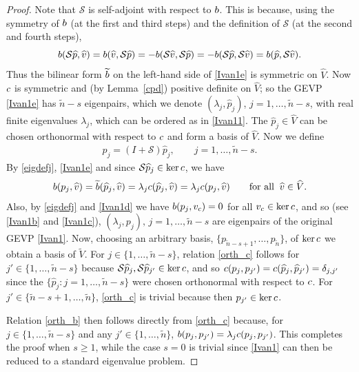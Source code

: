 \documentclass[10pt,a4paper]{amsart}
\newcommand{\scS}{\mathcal{S}}
\newcommand{\txtb}{\textup{\texttt{b}}}
\newcommand{\txtc}{\textup{\texttt{c}}}
\newcommand{\wV}{\widetilde{V}}
\newcommand{\whV}{\widehat{V}}
\newcommand{\whp}{\widehat{p}}
\newcommand{\whv}{\widehat{v}}
\begin{document}
\begin{proof}
Note that $\scS$ is self-adjoint with respect to $\txtb$. This is because, using the symmetry of $\txtb$ (at the first and third steps) 
and the definition of $\scS$ (at the second and fourth steps),  
\[
	\txtb(\scS \whp, \whv) = \txtb(\whv, \scS \whp) = -\txtb(\scS \whv, \scS \whp) 
	= -\txtb( \scS \whp,\scS \whv) =  \txtb(\whp, \scS \whv).
\] 
Thus the bilinear form $\widetilde{\txtb}$ on the left-hand side of \eqref{Ivan1e} is symmetric on $\whV$.
Now $\txtc$ is symmetric and (by Lemma~\ref{cpd}) positive definite on $\whV$;
so the GEVP \eqref{Ivan1e} has $\tilde n-s$ eigenpairs,
which we denote  $(\lambda_j, \whp_{j})$, $j = 1, \ldots , \tilde n-s$, with real finite eigenvalues $\lambda_j$,
which can be ordered as in \eqref{Ivan11}.  The $\whp_{j} \in \whV$ can be chosen orthonormal with respect to $\txtc$ 
and form a basis of $\whV$.  
Now we define 
\begin{align} \label{eigdefj} 
	p_j = (I + \scS)\whp_{j}, \qquad j = 1, \ldots, \tilde n-s.
\end{align} 
By \eqref{eigdefj}, \eqref{Ivan1e} and since $\scS \whp_{j} \in \ker \txtc$, we have 
\[
	\txtb(p_j, \whv) = {\widetilde{\txtb}(\whp_{j},\whv)}
	= \lambda_j \txtc(\whp_{j}, \whv) = \lambda_j \txtc(p_{j}, \whv)
	\qquad \text{for all} \;\; \whv \in \whV.
\]
Also, by \eqref{eigdefj} and \eqref{Ivan1d} we have $\txtb(p_j, v_{\txtc}) = 0$ for all $v_{\txtc} \in \ker \txtc$, and so
(see \eqref{Ivan1b} and  \eqref{Ivan1c}), 
$(\lambda_j, p_j),\,  j = 1, \ldots ,\tilde n-s$
are eigenpairs of the original GEVP \eqref{Ivan1}.
Now, choosing an arbitrary basis, $\{p_{\tilde n-s+1},\ldots,p_{\tilde n}\}$, of {$\ker\txtc$} we obtain a basis of $\wV$. 
For $j \in \{1, \ldots , \tilde n-s\}$, relation \eqref{orth_c} follows for $ j' \in \{ 1, \ldots, \tilde n-s\}$ 
because  $\scS \whp_{j}, \scS \whp_{j'} \in \ker \txtc$, and so $\txtc(p_j,p_{j'}) = \txtc(\whp_{j},\whp_{j'}) = \delta_{j,j'}$ 
since the $\{\whp_{j}: j = 1, \ldots, \tilde n-s\}$ were chosen orthonormal with respect to $\txtc$.   
For $j' \in  \{\tilde n-s+1, \ldots, \tilde n\}$,  \eqref{orth_c} is trivial because then $p_{j'} \in \ker \txtc$.

Relation \eqref{orth_b} then follows directly  from \eqref{orth_c} because,  for $j \in \{1, \ldots, \tilde n-s\}$ 
and any $j' {\in \{1,\dots,\tilde n\}}$, $\txtb(p_j, p_{j'}) = \lambda_j\txtc(p_j, p_{j'})$. 
This completes the proof when $s\ge1$, while the case $s = 0$ is trivial since \eqref{Ivan1} can then be reduced to a standard eigenvalue problem.     
\end{proof}
\end{document}

